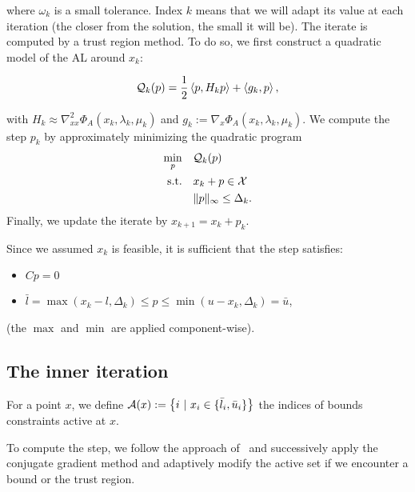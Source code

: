 \documentclass[10pt]{article}
\begin{document}
	where $\omega_k$ is a small tolerance. Index $k$ means that we will adapt its value at each iteration (the closer from the solution, the small it will be). The iterate is computed by a trust region method. To do so, we first construct a quadratic model of the AL around $x_k$:
	
	\begin{equation}\label{eq:quadratic_al}
		{\mathcal{Q}}_k(p) = \dfrac{1}{2}\left\langle {p} , {H_kp} \right\rangle + \left\langle {g_k} , {p} \right\rangle,
	\end{equation}
	
	with $H_k\approx\nabla^2_{xx} \Phi_A(x_k,\lambda_k,\mu_k)$  and $g_k:=\nabla_x \Phi_A(x_k,\lambda_k,\mu_k)$. We compute the step $p_k$ by approximately minimizing the quadratic program
	\begin{equation}\label{eq:quadratic_subpb} 
		\begin{aligned}
			\min_{p} \quad& {\mathcal{Q}}_k(p)  \\
			\text{s.t.}  \quad &  x_k+p\in {\mathcal{X}}\\
			& \|p\|_\infty \le \Delta_k.
		\end{aligned}	
	\end{equation}
	Finally, we update the iterate by $x_{k+1}=x_k+p_k$.
	
	Since we assumed $x_k$ is feasible, it is sufficient that the step satisfies:
	\begin{itemize}
		\item \(Cp=0\)
		\item $ \bar{l} = \max(x_k-l,\Delta_k) \le p \le \min (u-x_k,\Delta_k) = \bar{u}$,
	\end{itemize}
	(the $\max$ and $\min$ are applied component-wise).
	
	\subsection{The inner iteration}
	
	For a point $x$, we define ${\mathcal{A}}(x):=\left\{i\ \vert \ x_i \in \{\bar{l}_i,\bar{u}_i\}\right\}$ the indices of bounds constraints active at $x$.
	
	To compute the step, we follow the approach of~\citet{linmore:1999a} and successively apply the conjugate gradient method and adaptively modify the active set if we encounter a bound or the trust region.
	
\end{document}

